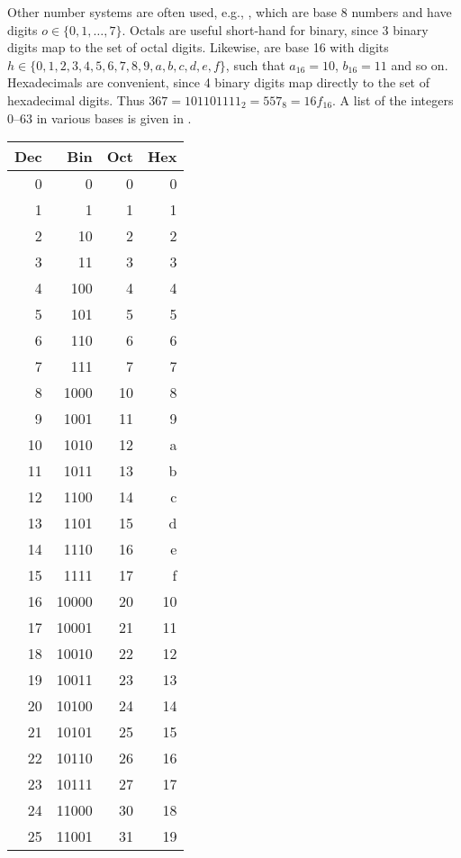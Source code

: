 \documentclass[fsharpNotes.tex]{subfiles}
\begin{document}
Other number systems are often used, e.g., , which are base 8 numbers and have digits $o\in\{0,1,\ldots,7\}$. Octals are useful short-hand for binary, since 3 binary digits map to the set of octal digits. Likewise,  are base 16 with digits $h\in\{0,1,2,3,4,5,6,7,8,9,a,b,c,d,e,f\}$, such that $a_{16}=10$, $b_{16}=11$ and so on. Hexadecimals are convenient, since 4 binary digits map directly to the set of hexadecimal digits. Thus $367 = 101101111_2 = 557_8 = 16f_{16}$. A list of the integers 0--63 in various bases is given in .
\begin{table}
  \centering
  \begin{tabular}{|r|r|r|r|}
    \hline
    \rowcolor{headerRowColor} Dec & Bin & Oct & Hex\\
    \hline
    0 & 0 & 0 & 0\\
    1 & 1 & 1 & 1\\
    2 & 10 & 2 & 2\\
    3 & 11 & 3 & 3 \\
    4 & 100 & 4 & 4\\
    5 & 101 & 5& 5\\
    6 & 110 & 6 & 6 \\
    7 & 111 & 7 & 7 \\
    8 & 1000 & 10 & 8\\
    9 & 1001 & 11 & 9\\
    10 & 1010 & 12 & a\\
    11 & 1011 & 13 & b\\
    12 & 1100 & 14 & c\\
    13 & 1101 & 15 & d\\
    14 & 1110 & 16 & e \\
    15 & 1111 & 17 & f\\
    16 & 10000 & 20 & 10\\
    17 & 10001 & 21 & 11\\
    18 & 10010 & 22 & 12\\
    19 & 10011 & 23 & 13 \\
    20 & 10100 & 24 & 14\\
    21 & 10101 & 25& 15\\
    22 & 10110 & 26 & 16 \\
    23 & 10111 & 27 & 17 \\
    24 & 11000 & 30 & 18\\
    25 & 11001 & 31 & 19\\

\end{tabular}
\end{table}
\end{document}
